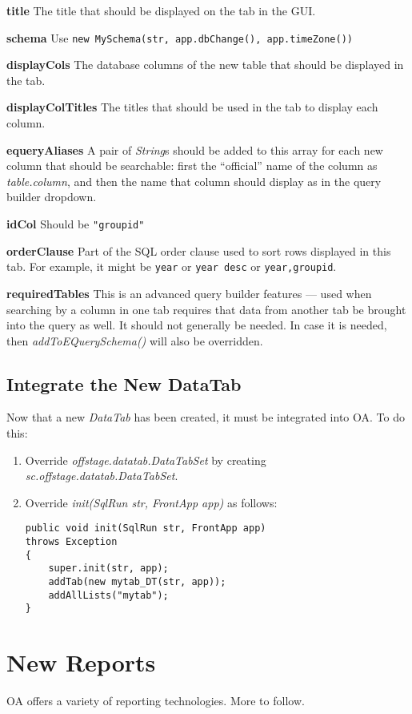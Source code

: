 \documentclass[11pt]{article}
\begin{document}
\begin{description}

\item{{\bf title}} The title that should be displayed on the tab in the GUI.
\item{{\bf schema}} Use {\tt new MySchema(str, app.dbChange(), app.timeZone())}
\item{{\bf displayCols}} The database columns of the new table that should be displayed in the tab.
\item{{\bf displayColTitles}} The titles that should be used in the tab to display each column.
 \item{{\bf equeryAliases}} A pair of \emph{String}s should be added to this array for each new column that should be searchable: first the ``official'' name of the column as \emph{table.column}, and then the name that column should display as in the query builder dropdown.
 \item{{\bf idCol}} Should be {\tt "groupid"}
 \item{{\bf orderClause}} Part of the SQL order clause used to sort rows displayed in this tab.  For example, it might be {\tt year} or {\tt year desc} or {\tt year,groupid}.
 \item{{\bf requiredTables}} This is an advanced query builder features --- used when searching by a column in one tab requires that data from another tab be brought into the query as well.  It should not generally be needed.  In case it is needed, then \emph{addToEQuerySchema()} will also be overridden.
\end{description}

\subsection{Integrate the New DataTab}

Now that a new \emph{DataTab} has been created, it must be integrated into OA.  To do this:
 \begin{enumerate}
 \item Override \emph{offstage.datatab.DataTabSet} by creating \emph{sc.offstage.datatab.DataTabSet}.
 \item Override \emph{init(SqlRun str, FrontApp app)} as follows:
\begin{verbatim}
public void init(SqlRun str, FrontApp app)
throws Exception
{
    super.init(str, app);
    addTab(new mytab_DT(str, app));
    addAllLists("mytab");
}
\end{verbatim}
 \end{enumerate}


\section{New Reports}

OA offers a variety of reporting technologies.  More to follow.
\end{document}
